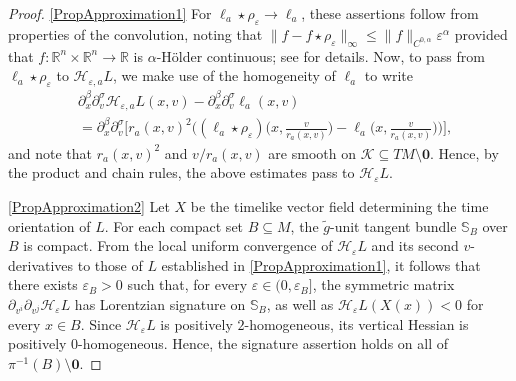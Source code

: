 \documentclass[a4paper,11pt]{article}
\numberwithin{equation}{section}
\theoremstyle{definition}
\theoremstyle{plain}
\newcommand{\R}{\mathbb R}
\newcommand{\eps}{\varepsilon}
\begin{document}
\begin{proof}
\ref{PropApproximation1}
For $\ell_a \star \rho_\eps \to \ell_a$, these assertions follow from properties of the convolution, noting that $\| f - f\star\rho_\eps\|_{\infty} \leq \| f\|_{C^{0,\alpha}} \eps^\alpha$ provided that $f\colon \R^n \times \R^n \rightarrow \R$ is $\alpha$-H\"older continuous; see \cite[Proposition 3.5]{Graf-SingularityC1} for details. 
Now, to pass from $\ell_a \star \rho_\eps$ to $\mathcal{H}_{\eps, a}L$, we make use of the homogeneity of $\ell_a$ to write
\begin{align*}
    &\partial_x^\beta \partial_v^\sigma \mathcal{H}_{\eps, a}L(x,v) - \partial_x^\beta \partial_v^\sigma \ell_a(x,v) \\
    &= \partial_x^\beta \partial_v^\sigma \biggl[ r_a(x,v)^2 \biggl((\ell_a \star \rho_\eps)\biggl(x,\frac{v}{r_a(x,v)}\biggr) -  \ell_a\biggl(x,\frac{v}{r_a(x,v)}\biggr)\biggr) \biggr],
\end{align*}
and note that $r_a(x,v)^2$ and $v/r_a(x,v)$ are smooth on $\mathcal{K} \subseteq TM \setminus \mathbf{0}$. 
Hence, by the product and chain rules, the above estimates pass to $\mathcal{H}_{\eps}L$.

\ref{PropApproximation2}
Let $X$ be the timelike vector field determining the time orientation of $L$. 
For each compact set $ B \subseteq M$, the $\tilde g$-unit tangent bundle $\mathbb S_B$ over $B$ is compact. 
From the local uniform convergence of $\mathcal H_\varepsilon L$ and its second $v$-derivatives to those of $L$ established in \ref{PropApproximation1}, it follows that there exists $\varepsilon_B > 0$ such that, for every $\varepsilon \in (0,\varepsilon_B]$, the symmetric matrix $\partial_{v^i}\partial_{v^j}\mathcal H_\varepsilon L$ has Lorentzian signature on $\mathbb{S}_B$, as well as $\mathcal H_\varepsilon L(X(x)) < 0$ for every $x \in B$. 
Since $\mathcal H_\varepsilon L$ is positively $2$-homogeneous, its vertical Hessian is positively $0$-homogeneous. 
Hence, the signature assertion holds on all of $\pi^{-1}(B)\setminus \mathbf 0$.


\end{proof}
\end{document}

